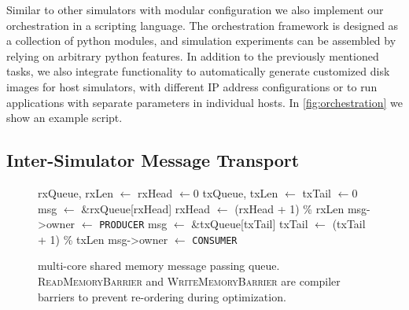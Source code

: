 Similar to other simulators with modular configuration we also implement our
orchestration in a scripting language.
The \sysname orchestration framework is designed as a collection of python
modules, and simulation experiments can be assembled by relying on arbitrary
python features.
In addition to the previously mentioned tasks, we also integrate functionality
to automatically generate customized disk images for host simulators, \eg with
different IP address configurations or to run applications with separate
parameters in individual hosts.
In \autoref{fig:orchestration} we show an example script.


\subsection{Inter-Simulator Message Transport}
\label{sec:appendix:shm}

\begin{figure}%
\begin{algorithmic}[0]%
  \State rxQueue, rxLen $\gets$ 
  \State rxHead $\gets 0$
  \State txQueue, txLen $\gets$ 
  \State txTail $\gets 0$
  \State
    \State msg $\gets$ \&rxQueue[rxHead]
      \State {}
    \EndWhile
    \State {}
    \State rxHead $\gets$ (rxHead + 1) \% rxLen
    \State {}
  \EndProcedure
    \State msg->owner $\gets$ \texttt{PRODUCER}
  \EndProcedure
    \State msg $\gets$ \&txQueue[txTail]
      \State {}
    \EndWhile
    \State txTail $\gets$ (txTail + 1) \% txLen
    \State {}
  \EndProcedure
    \State {}
    \State msg->owner $\gets$ \texttt{CONSUMER}
  \EndProcedure
\end{algorithmic}%
\caption{\sysname multi-core shared memory message passing queue.
  \textsc{ReadMemoryBarrier} and \textsc{WriteMemoryBarrier} are compiler
  barriers to prevent re-ordering during optimization.}%
\label{fig:shm-queue}%
%
\end{figure}


